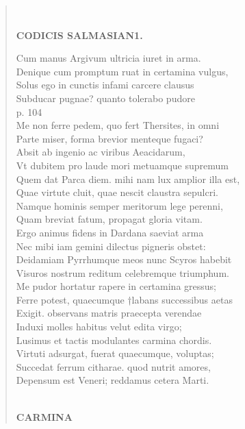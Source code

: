 \documentclass[11pt, a4paper]{report}
\begin{document}
\begin{verse}
        ﻿\pagebreak 
     \marginpar{[165]} \begin{center} \textbf{CODICIS SALMASIAN1.} \end{center}Cum manus Argivum ultricia iuret in arma. \\ Denique cum promptum ruat in certamina vulgus, \\ Solus ego in cunctis infami carcere clausus \\ Subducar pugnae? quanto tolerabo pudore \\ p. 104 \\ Me non ferre pedem, quo fert Thersites, in omni \\ Parte miser, forma brevior menteque fugaci? \\ Absit ab ingenio ac viribus Aeacidarum, \\ Vt dubitem pro laude mori metuamque supremum \\ Quem dat Parca diem. mihi nam lux amplior illa est, \\ Quae virtute cluit, quae nescit claustra sepulcri. \\ Namque hominis semper meritorum lege perenni, \\ Quam breviat fatum, propagat gloria vitam. \\ Ergo animus fidens in Dardana saeviat arma \\ Nec mibi iam gemini dilectus pigneris obstet: \\ Deidamiam Pyrrhumque meos nunc Scyros habebit \\ Visuros nostrum reditum celebremque triumphum. \\ Me pudor hortatur rapere in certamina gressus; \\ Ferre potest, quaecumque †labans successibus aetas \\ Exigit. observans matris praecepta verendae \\ Induxi molles habitus velut edita virgo; \\ Lusimus et tactis modulantes carmina chordis. \\ Virtuti adsurgat, fuerat quaecumque, voluptas; \\ Succedat ferrum citharae. quod nutrit amores, \\ Depensum est Veneri; reddamus cetera Marti. \\ 
        ﻿\pagebreak 
     \marginpar{[166]} \begin{center} \textbf{CARMINA} \end{center}
      \end{verse}
  
\end{document}
